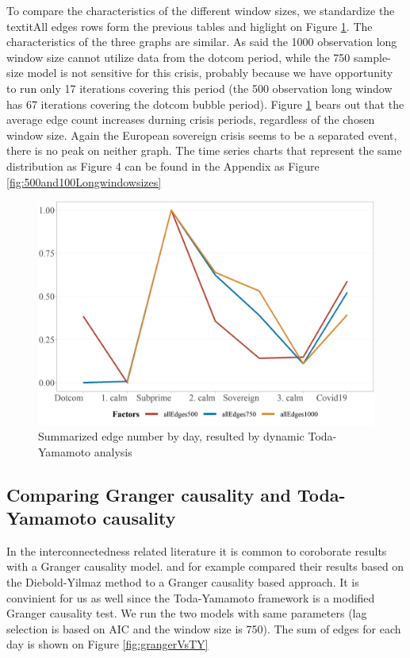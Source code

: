 \documentclass[12pt,bibliography=totoc]{article}
\begin{document}
To compare the characteristics of the different window sizes, we standardize the textit{All edges} rows form the previous tables and higlight on Figure \ref{fig:differentWindowSizes}. The characteristics of the three graphs are similar. As said the 1000 observation long window size cannot utilize data from the dotcom period, while the 750 sample-size model is not sensitive for this crisis, probably because we have opportunity to run only 17 iterations covering this period (the 500 observation long window has 67 iterations covering the dotcom bubble period). Figure \ref{fig:differentWindowSizes} bears out that the average edge count increases durning crisis periods, regardless of the chosen window size. Again the European sovereign crisis seems to be a separated event, there is no peak on neither graph. The time series charts that represent the same distribution as Figure 4 can be found in the Appendix as Figure \ref{fig:500and100Longwindowsizes}


\begin{figure}[H]
\includegraphics[width=13.5cm]{characteristics}
\centering

\caption{Summarized edge number by day, resulted by dynamic Toda-Yamamoto analysis }
\label{fig:differentWindowSizes}

\end{figure}

\subsection{Comparing Granger causality and Toda-Yamamoto causality}

In the interconnectedness related literature it is common to coroborate results with a Granger causality model. \cite{zhang2017oil} and \cite{umar2021oil} for example compared their results based on the Diebold-Yilmaz method to a Granger causality based approach. It is convinient for us as well since the Toda-Yamamoto framework is a modified Granger causality test. We run the two models with same parameters (lag selection is based on AIC and the window size is 750). The sum of edges for each day is shown on Figure \ref{fig:grangerVsTY}
\end{document}

